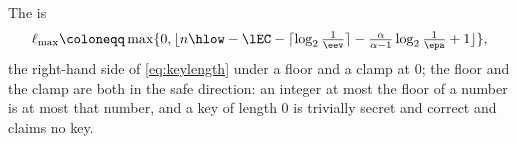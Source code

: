 
\begin{definition}\label{def:max-key-length}
The
is
\[
  \ell_{\max}\coloneqq\max\{0,\lfloor
  n\hlow-\lEC-\lceil\log_2\tfrac1{\eev}\rceil
  -\tfrac{\alpha}{\alpha-1}\log_2\tfrac1{\epa}+1\rfloor\},
\]
the right-hand side of \eqref{eq:keylength} under a floor and a clamp at
$0$; the floor and the clamp are both in the safe direction: an integer
at most the floor of a number is at most that number, and a key of length
$0$ is trivially secret and correct and claims no key.
\end{definition}
